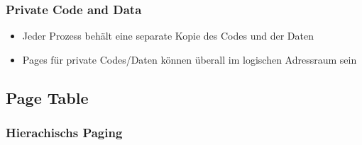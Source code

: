 \documentclass[a4paper]{scrreprt}
\begin{document}
\subsubsection{Private Code and Data}
\begin{itemize}
\item Jeder Prozess behält eine separate Kopie des Codes und der Daten
\item Pages für private Codes/Daten können überall im logischen Adressraum sein
\end{itemize}

\subsection{Page Table}
\subsubsection{Hierachischs Paging}
\end{document}
